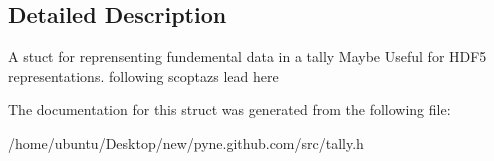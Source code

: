 \subsection{Detailed Description}
A stuct for reprensenting fundemental data in a tally Maybe Useful for H\+D\+F5 representations. following scoptaz\textquotesingle{}s lead here 

The documentation for this struct was generated from the following file\+:\begin{DoxyCompactItemize}
\item 
/home/ubuntu/\+Desktop/new/pyne.\+github.\+com/src/tally.\+h\end{DoxyCompactItemize}
